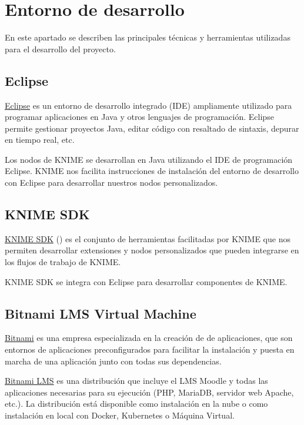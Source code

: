 

\section{Entorno de desarrollo}

En este apartado se describen las principales técnicas y herramientas utilizadas para el desarrollo del proyecto. 


\subsection{Eclipse}

\href{https://www.eclipse.org/ide/}{Eclipse} es un entorno de desarrollo integrado (IDE) ampliamente utilizado para programar aplicaciones en Java y 
otros lenguajes de programación. Eclipse permite gestionar proyectos Java, editar código con resaltado de sintaxis,
 depurar en tiempo real, etc. 
\

Los nodos de KNIME se desarrollan en Java utilizando el IDE de programación Eclipse. KNIME nos facilita instrucciones de 
instalación del entorno de desarrollo con Eclipse para desarrollar nuestros nodos personalizados. 


\subsection{KNIME SDK}


\href{https://github.com/knime/knime-sdk-setup}{KNIME SDK} () es el conjunto de herramientas facilitadas por KNIME que nos permiten desarrollar 
extensiones y nodos personalizados que pueden integrarse en los flujos de trabajo de KNIME.
\

KNIME SDK se integra con Eclipse para desarrollar componentes de KNIME. 


\subsection{Bitnami LMS Virtual Machine}

\href{https://bitnami.com/}{Bitnami} es una empresa especializada en la creación de  de aplicaciones, 
que son entornos de aplicaciones preconfigurados para facilitar la instalación y puesta en marcha de una aplicación junto 
con todas sus dependencias. 
\

\href{https://bitnami.com/stack/moodle}{Bitnami LMS} es una distribución que incluye el LMS Moodle y todas las aplicaciones 
necesarias para su ejecución (PHP, MariaDB, servidor web Apache, etc.). La distribución está disponible como instalación en la nube 
o como instalación en local con Docker, Kubernetes o Máquina Virtual. 
\

